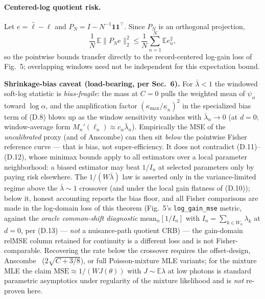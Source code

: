 \paragraph{Centered-log quotient risk.}
Let $e=\hat\ell-\ell$ and $P_N=I-N^{-1}\mathbf1\mathbf1^\top$. Since $P_N$ is an orthogonal projection,
\[
\frac1N\,\mathbb E\|P_Ne\|_2^2\le\frac1N\sum_{n=1}^N\mathbb Ee_n^2 ,
\]
so the pointwise bounds transfer directly to the record-centered log-gain loss of Fig.~5; overlapping windows need not be independent for this expectation bound.

\begin{statusblock}\textbf{Shrinkage-bias caveat (load-bearing, per Sec.~6).} For $\bar\lambda<1$ the windowed soft-log statistic is \emph{bias-fragile}: the mass at $C=0$ pulls the weighted mean of $\psi_\alpha$ toward $\log\alpha$, and the amplification factor $(\kappa_{\max}/\underline\kappa_n)^2$ in the specialized bias term of (D.8) blows up as the window sensitivity vanishes with $\bar\lambda_n\to0$ (at $d=0$; window-average form $M_n'(\ell_n)\approx c_\alpha\bar\lambda_n$). Empirically the MSE of the \emph{uncalibrated} proxy (and of Anscombe) can then sit \emph{below} the pointwise Fisher reference curve --- that is bias, not super-efficiency. It does not contradict (D.11)--(D.12), whose minimax bounds apply to all estimators over a local parameter neighborhood: a biased estimator may beat $1/I_n$ at selected parameters only by paying risk elsewhere. The $1/(W\bar\lambda)$ law is asserted only in the variance-limited regime above the $\bar\lambda\sim1$ crossover (and under the local gain flatness of (D.10)); below it, honest accounting reports the bias floor, and all Fisher comparisons are made in the log-domain loss of this theorem (Fig.~5's \texttt{log\_gain\_mse} metric, against the \emph{oracle common-shift diagnostic} $\mathrm{mean}_n[1/I_n]$ with $I_n=\sum_{k\in W_n}\lambda_k$ at $d=0$, per (D.13) --- \emph{not} a nuisance-path quotient CRB) --- the gain-domain relMSE column retained for continuity is a different loss and is not Fisher-comparable. Recovering the rate below the crossover requires the offset-design, Anscombe~\cite{Anscombe1948} ($2\sqrt{C+3/8}$), or full Poisson-mixture MLE variants; for the mixture MLE the claim $\mathrm{MSE}\approx1/(WJ(\theta))$ with $J\sim\mathbb{E}\lambda$ at low photons is standard parametric asymptotics under regularity of the mixture likelihood and is \emph{not} re-proven here.\end{statusblock}

